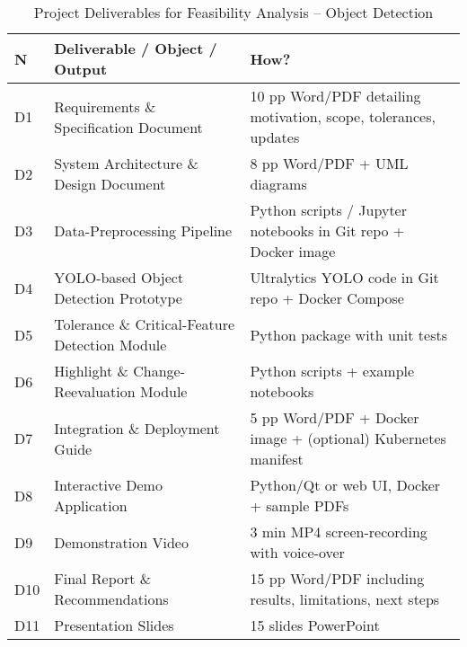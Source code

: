 \begin{table}[ht]
    \centering
    \caption{Project Deliverables for Feasibility Analysis – Object Detection}
    \begin{tabular}{p{1cm} p{7cm} p{6cm}}
    \toprule
    \textbf{N} & \textbf{Deliverable / Object / Output} & \textbf{How?} \\
    \midrule
    D1 & Requirements \& Specification Document
       & \textapprox{}10 pp Word/PDF detailing motivation, scope, tolerances, updates \\[4pt]
    D2 & System Architecture \& Design Document
       & \textapprox{}8 pp Word/PDF + UML diagrams \\[4pt]
    D3 & Data-Preprocessing Pipeline
       & Python scripts / Jupyter notebooks in Git repo + Docker image \\[4pt]
    D4 & YOLO-based Object Detection Prototype
       & Ultralytics YOLO code in Git repo + Docker Compose \\[4pt]
    D5 & Tolerance \& Critical-Feature Detection Module
       & Python package with unit tests \\[4pt]
    D6 & Highlight \& Change-Reevaluation Module
       & Python scripts + example notebooks \\[4pt]
    D7 & Integration \& Deployment Guide
       & \textapprox{}5 pp Word/PDF + Docker image + (optional) Kubernetes manifest \\[4pt]
    D8 & Interactive Demo Application
       & Python/Qt or web UI, Docker + sample PDFs \\[4pt]
    D9 & Demonstration Video
       & \textapprox{}3 min MP4 screen-recording with voice-over \\[4pt]
    D10 & Final Report \& Recommendations
        & \textapprox{}15 pp Word/PDF including results, limitations, next steps \\[4pt]
    D11 & Presentation Slides
        & \textapprox{}15 slides PowerPoint \\
    \bottomrule
    \end{tabular}
    \end{table}
    